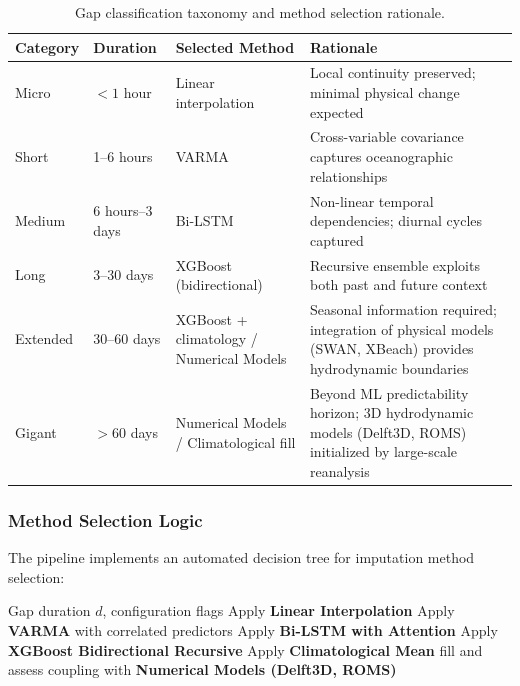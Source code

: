 \documentclass[12pt,a4paper]{article}
\begin{document}
\begin{table}[H]
\centering
\caption{Gap classification taxonomy and method selection rationale.}
\label{tab:gap_taxonomy}
\begin{tabularx}{\textwidth}{@{}llXX@{}}
\toprule
\textbf{Category} & \textbf{Duration} & \textbf{Selected Method} & \textbf{Rationale} \\ \midrule
Micro   & $< 1$ hour       & Linear interpolation  & Local continuity preserved; minimal physical change expected \\
Short   & 1--6 hours       & VARMA                 & Cross-variable covariance captures oceanographic relationships \\
Medium  & 6 hours--3 days  & Bi-LSTM               & Non-linear temporal dependencies; diurnal cycles captured \\
Long    & 3--30 days       & XGBoost (bidirectional) & Recursive ensemble exploits both past and future context \\
Extended & 30--60 days     & XGBoost + climatology / Numerical Models & Seasonal information required; integration of physical models (SWAN, XBeach) provides hydrodynamic boundaries \\
Gigant  & $> 60$ days      & Numerical Models / Climatological fill   & Beyond ML predictability horizon; 3D hydrodynamic models (Delft3D, ROMS) initialized by large-scale reanalysis \\
\bottomrule
\end{tabularx}
\end{table}

\subsubsection{Method Selection Logic}

The pipeline implements an automated decision tree for imputation method selection:

\begin{algorithm}[H]
\caption{Automatic Method Selection Based on Gap Duration}
\begin{algorithmic}[1]
\Require Gap duration $d$, configuration flags
    \State Apply \textbf{Linear Interpolation}
    \State Apply \textbf{VARMA} with correlated predictors
    \State Apply \textbf{Bi-LSTM with Attention}
    \State Apply \textbf{XGBoost Bidirectional Recursive}
\Else
    \State Apply \textbf{Climatological Mean} fill and assess coupling with \textbf{Numerical Models (Delft3D, ROMS)}
\EndIf
\end{algorithmic}
\end{algorithm}
\end{document}
